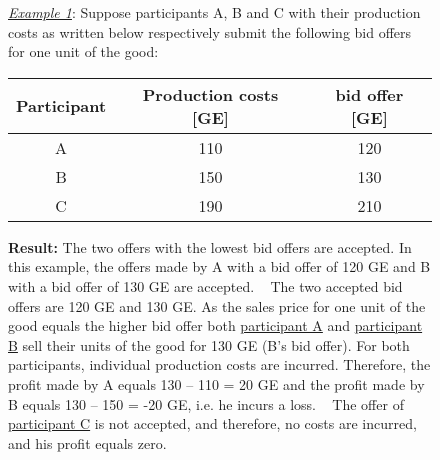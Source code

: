 \documentclass[11pt]{scrartcl}
\begin{document}
\begin{figure}[h!] 
	\begin{minipage}[t]{1\linewidth} 
		\begin{tcolorbox}[colback=pink,arc=0pt,colframe=black!25]
			\underline{\textit{Example 1}}: Suppose participants A, B and C with their production costs as written below respectively submit the following bid offers for one unit of the good:
			\begin{center}
				\begin{tabular}{c|cc}
					Participant & Production costs [GE] & bid offer [GE] \\
					\hline
					A			& 110				 	& 120 	\\
					B			& 150	 				& 130   \\
					C			& 190					& 210
				\end{tabular} \bigbreak	
			\end{center}	
			\textbf{Result:} The two offers with the lowest bid offers are accepted. In this example, the offers made by A with a bid offer of 120 GE and B with a bid offer of 130 GE are accepted. ~\medbreak
			The two accepted bid offers are 120 GE and 130 GE. As the sales price for one unit of the good equals the higher bid offer both \underline{participant A} and \underline{participant B} sell their units of the good for 130 GE (B's bid offer). For both participants, individual production costs are incurred. Therefore, the profit made by A equals 130 – 110 = 20 GE and the profit made by B equals 130 – 150 = -20 GE, i.e. he incurs a loss. ~\medbreak
			The offer of \underline{participant C} is not accepted, and therefore, no costs are incurred, and his profit equals zero.      
		\end{tcolorbox} 
	\end{minipage}  
\end{figure}

\end{document}

